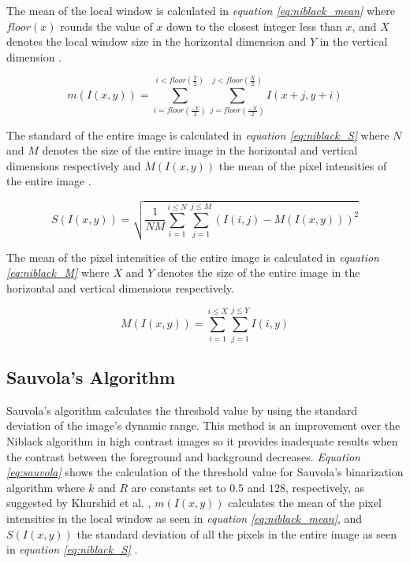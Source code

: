 \documentclass[11pt]{article}
\begin{document}
				The mean of the local window is calculated in \textit{equation \ref{eq:niblack_mean}} where $floor(x)$ rounds the value of $x$ down to the closest integer less than $x$, and $X$ denotes the local window size in the horizontal dimension and $Y$ in the vertical dimension \cite{khurshid2009comparison}.

				\begin{large}
				\begin{equation} \label{eq:niblack_mean}
					m(I(x, y)) = \sum_{i = floor(\frac{-Y}{2})}^{i < floor(\frac{Y}{2})}\sum_{j = floor(\frac{-X}{2})}^{j < floor(\frac{X}{2})} I(x + j, y + i)
				\end{equation}
				\end{large}

				The standard of the entire image is calculated in \textit{equation \ref{eq:niblack_S}} where $N$ and $M$ denotes the size of the entire image in the horizontal and vertical dimensions respectively and $M(I(x, y))$ the mean of the pixel intensities of the entire image \cite{khurshid2009comparison}.

				\begin{large}
				\begin{equation} \label{eq:niblack_S}
					S(I(x, y)) = \sqrt{\frac{1}{NM} \sum_{i = 1}^{i \leq N}\sum_{j = 1}^{j \leq M}(I(i, j) - M(I(x, y)))^2}
				\end{equation}
				\end{large}

				The mean of the pixel intensities of the entire image is calculated in \textit{equation \ref{eq:niblack_M}} where $X$ and $Y$ denotes the size of the entire image in the horizontal and vertical dimensions respectively.

				\begin{large}
				\begin{equation} \label{eq:niblack_M}
					M(I(x, y)) = \sum_{i = 1}^{i \leq X}\sum_{j = 1}^{j \leq Y} I(i, y)
				\end{equation}
				\end{large}

  		\subsection{Sauvola's Algorithm}
  			Sauvola's algorithm calculates the threshold value by using the standard deviation of the image's dynamic range. This method is an improvement over the Niblack algorithm in high contrast images so it provides inadequate results when the contrast between the foreground and background decreases. \textit{Equation \ref{eq:sauvola}} shows the calculation of the threshold value for Sauvola's binarization algorithm where $k$ and $R$ are constants set to $0.5$ and $128$, respectively, as suggested by Khurshid et al. \cite{khurshid2009comparison}, $m(I(x, y))$ calculates the mean of the pixel intensities in the local window as seen in \textit{equation \ref{eq:niblack_mean}}, and $S(I(x, y))$ the standard deviation of all the pixels in the entire image as seen in \textit{equation \ref{eq:niblack_S}} \cite{khurshid2009comparison}.
\end{document}
